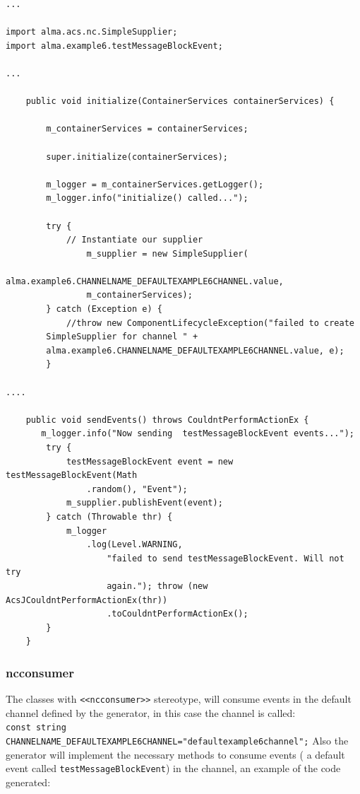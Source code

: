 \begin{center}
\begin{verbatim}
...

import alma.acs.nc.SimpleSupplier;
import alma.example6.testMessageBlockEvent;

...

    public void initialize(ContainerServices containerServices) {

        m_containerServices = containerServices;

        super.initialize(containerServices);

        m_logger = m_containerServices.getLogger();
        m_logger.info("initialize() called...");

        try {
            // Instantiate our supplier
                m_supplier = new SimpleSupplier(
                    alma.example6.CHANNELNAME_DEFAULTEXAMPLE6CHANNEL.value,
                m_containerServices);
        } catch (Exception e) {
            //throw new ComponentLifecycleException("failed to create
        SimpleSupplier for channel " + 
        alma.example6.CHANNELNAME_DEFAULTEXAMPLE6CHANNEL.value, e); 
        }

....

    public void sendEvents() throws CouldntPerformActionEx {
       m_logger.info("Now sending  testMessageBlockEvent events...");
        try {
            testMessageBlockEvent event = new testMessageBlockEvent(Math
                .random(), "Event");
            m_supplier.publishEvent(event);
        } catch (Throwable thr) {
            m_logger
                .log(Level.WARNING,
                    "failed to send testMessageBlockEvent. Will not try
                    again."); throw (new AcsJCouldntPerformActionEx(thr))
                    .toCouldntPerformActionEx();
        }
    }
\end{verbatim}
\end{center}

\subsubsection{ncconsumer}
The classes with  \verb+<<ncconsumer>>+ stereotype, will consume events in the
default channel defined by the generator, in this case the channel is called:\\
\verb+const string CHANNELNAME_DEFAULTEXAMPLE6CHANNEL="defaultexample6channel";+
Also the generator will implement the necessary methods to consume events ( a
default event called \verb+testMessageBlockEvent+) in the channel, an
example of the code generated:

